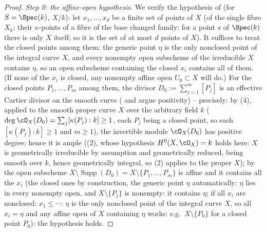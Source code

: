\begin{proof}
\emph{Step 0: the affine-open hypothesis.}  We verify the hypothesis of
 (for $S=\Spec(k)$, $X/k$): let
$x_1,\dots,x_d$ be a finite set of points of $X$ (of the single fibre
$X_k$; their $\kappa$-points of a fibre of the base changed family:
for a point $s$ of $\Spec(k)$ there is only $X$ itself; so it is the
set of at most $d$ points of $X$).  It suffices to treat the closed
points among them: the generic point $\eta$ is the only nonclosed
point of the integral curve $X$, and every nonempty open subscheme of
the irreducible $X$ contains $\eta$, so an open subscheme containing
the closed $x_i$ contains all of them.  (If none of the $x_i$ is
closed, any nonempty affine open $U_0\subset X$ will do.)  For the
closed points $P_1,\dots,P_m$ among them, the divisor
$D_0:=\sum_{j=1}^m[P_j]$ is an effective Cartier divisor on the smooth
curve ( and
 argue positivity) -- precisely:
by (4), applied to the smooth proper
curve $X$ over the arbitrary field $k$
($\deg\cO_X(D_0)=\sum_j[\kappa(P_j):k]\ge1$, each $P_j$ being a closed
point, so each $[\kappa(P_j):k]\ge1$ and $m\ge1$), the
invertible module
$\cO_X(D_0)$ has positive degree; hence it is ample
((2), whose hypothesis
$H^0(X,\cO_X)=k$ holds here: $X$ is geometrically irreducible by
assumption and geometrically reduced, being smooth over $k$, hence
geometrically integral, so (2) applies
to the proper $X$); by
 the open subscheme
$X\setminus\operatorname{Supp}(D_0)=X\setminus\{P_1,\dots,P_m\}$
is affine and it contains all the $x_i$ (the closed ones by
construction, the generic point $\eta$ automatically: $\eta$ lies in
every nonempty open, and $X\setminus\{P_j\}$ is nonempty: it contains
$\eta$; if all $x_i$ are nonclosed: $x_1\le\cdots$: $\eta$ is the only
nonclosed point of the integral curve $X$, so all $x_i=\eta$ and any
affine open of $X$ containing $\eta$ works: e.g.\ $X\setminus\{P_0\}$
for a closed point $P_0$): the hypothesis holds.


\end{proof}
